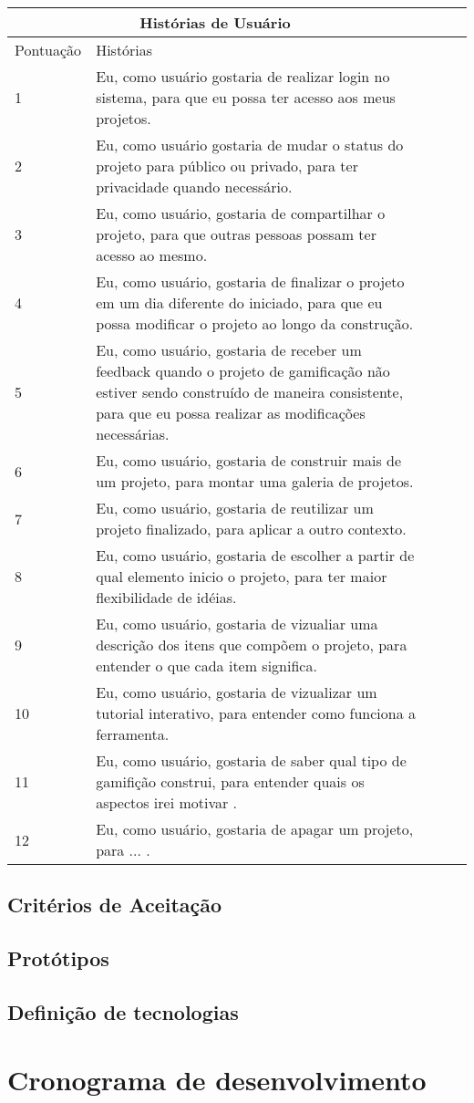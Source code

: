 \begin{tabular}{|l||l|l|l|l|}

\hline
\multicolumn{2}{|c}{\textbf{Histórias de Usuário}}\\ \hline
Pontuação & Histórias \\
\hline
1 &Eu, como usuário gostaria de realizar login no sistema, para que eu possa ter acesso aos meus projetos.\\
\hline
2 &Eu, como usuário gostaria de mudar o status do projeto para público ou privado,  para ter privacidade quando necessário.\\
\hline
3 & Eu, como usuário, gostaria de compartilhar o projeto, para que outras pessoas possam ter acesso ao mesmo.\\
\hline
4 &  Eu, como usuário, gostaria de finalizar o projeto em um dia diferente do iniciado, para que eu possa modificar o projeto ao longo da construção. \\
\hline
5 & Eu, como usuário, gostaria de receber um feedback quando o projeto de gamificação não estiver sendo construído de maneira consistente, para que eu possa realizar as modificações necessárias.\\
\hline
6 &Eu, como usuário, gostaria de construir mais de um projeto, para montar uma galeria de projetos.\\
\hline
7 & Eu, como usuário, gostaria de reutilizar um projeto finalizado, para aplicar a outro contexto.\\
\hline
8 & Eu, como usuário, gostaria de escolher a partir de qual elemento inicio o projeto, para ter maior flexibilidade de idéias.\\
\hline
9 & Eu, como usuário, gostaria de vizualiar uma descrição dos itens que compõem o projeto, para entender o que cada item significa.\\
\hline
10 & Eu, como usuário, gostaria de vizualizar um tutorial interativo, para entender como funciona a ferramenta.\\
\hline
11 & Eu, como usuário, gostaria de saber qual tipo de gamifição construi, para entender quais os aspectos irei motivar .\\
\hline
12 & Eu, como usuário, gostaria de apagar um projeto, para ... .\\
\hline
\end{tabular}

\subsection{Critérios de Aceitação}


\subsection{Protótipos}

	
\subsection{Definição de tecnologias}

\section{Cronograma de desenvolvimento}